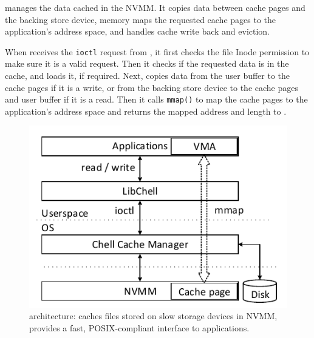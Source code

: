 \Drv{} manages the data cached in the NVMM.
It copies data between cache pages and the backing store device,
memory maps the requested cache pages to the application's address space,
and handles cache write back and eviction.

When \drv{} receives the \texttt{ioctl} request from \lib{},
it first checks the
file Inode permission to make sure it is a valid request.  Then it checks if 
the requested data is in the cache,
and loads it, if required.
Next, \drv{} copies data from the user buffer to the cache pages if it is
a write, or from the backing store device to the cache pages and user buffer if 
it is a read. Then it calls \texttt{mmap()} to map the cache pages to
the application's address space and returns the mapped address and length
to \lib{}.


\begin{figure}
\includegraphics{Figures/Chell-Stack.pdf}
\caption{\CChell{} architecture: \CChell{} caches files stored on slow storage
devices in NVMM, provides a fast, POSIX-compliant interface to applications.}
\label{fig:CChellstack}
\end{figure}

